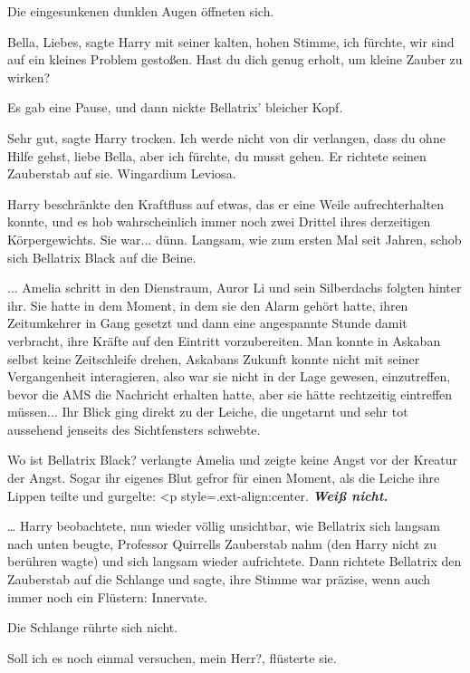 Die eingesunkenen dunklen Augen öffneten sich.

\glqq{}Bella, Liebes\grqq{}, sagte Harry mit seiner kalten, hohen Stimme, \glqq{}
ich fürchte, wir sind auf ein kleines Problem gestoßen. Hast du dich genug
erholt, um kleine Zauber zu wirken?\grqq{}

Es gab eine Pause, und dann nickte Bellatrix' bleicher Kopf.

\glqq{}Sehr gut\grqq{}, sagte Harry trocken. \glqq{}Ich werde nicht von dir
verlangen, dass du ohne Hilfe gehst, liebe Bella, aber ich fürchte, du musst
gehen.\grqq{} Er richtete seinen Zauberstab auf sie. \glqq{}Wingardium Leviosa.\grqq{}

Harry beschränkte den Kraftfluss auf etwas, das er eine Weile aufrechterhalten
konnte, und es hob wahrscheinlich immer noch zwei Drittel ihres derzeitigen
Körpergewichts. Sie war... dünn. Langsam, wie zum ersten Mal seit Jahren, schob
sich Bellatrix Black auf die Beine.

... Amelia schritt in den Dienstraum, Auror Li und sein Silberdachs folgten
hinter ihr. Sie hatte in dem Moment, in dem sie den Alarm gehört hatte, ihren
Zeitumkehrer in Gang gesetzt und dann eine angespannte Stunde damit verbracht,
ihre Kräfte auf den Eintritt vorzubereiten. Man konnte in Askaban selbst keine
Zeitschleife drehen, Askabans Zukunft konnte nicht mit seiner Vergangenheit
interagieren, also war sie nicht in der Lage gewesen, einzutreffen, bevor die
AMS die Nachricht erhalten hatte, aber sie hätte rechtzeitig eintreffen
müssen... Ihr Blick ging direkt zu der Leiche, die ungetarnt und sehr tot
aussehend jenseits des Sichtfensters schwebte.

\glqq{}Wo ist Bellatrix Black?\grqq{} verlangte Amelia und zeigte keine Angst vor
der Kreatur der Angst. Sogar ihr eigenes Blut gefror für einen Moment, als die
Leiche ihre Lippen teilte und gurgelte: <p
style=\grqq{}.ext-align:center\grqq{}. \textbf{\emph{ \glqq{}Weiß nicht.\grqq{}
}}

… Harry beobachtete, nun wieder völlig unsichtbar, wie Bellatrix sich langsam
nach unten beugte, Professor Quirrells Zauberstab nahm (den Harry nicht zu
berühren wagte) und sich langsam wieder aufrichtete. Dann richtete Bellatrix den
Zauberstab auf die Schlange und sagte, ihre Stimme war präzise, wenn auch immer
noch ein Flüstern: \glqq{}Innervate.\grqq{}

Die Schlange rührte sich nicht.

\glqq{}Soll ich es noch einmal versuchen, mein Herr?\grqq{}, flüsterte sie.

